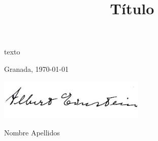 \documentclass[a4paper,10pt]{scrartcl}
\newcommand{\miTitulo}{Título\xspace}
\newcommand{\miNombre}{Nombre Apellidos\xspace}
\begin{document}
\title{\miTitulo}
\author{}
\date{}
\maketitle
\thispagestyle{scrheadings}
texto

\vfill\vfill
\begin{center}
  Granada, \today

  \includegraphics[width=7cm]{img/firma}

  \miNombre
\end{center}
\vfill
\end{document}
